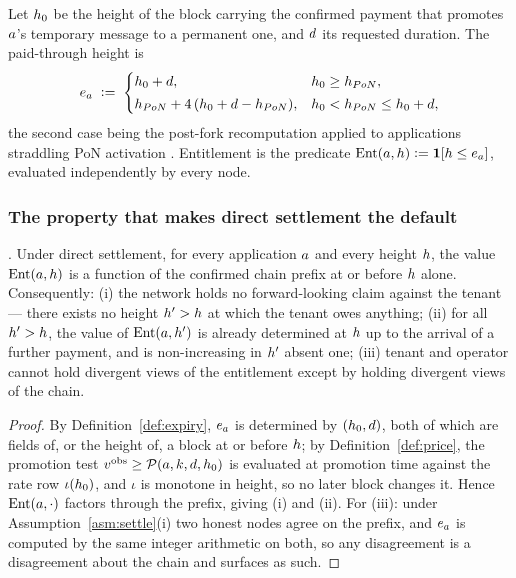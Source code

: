 \begin{definition}
\label{def:expiry}
Let $h_0$ be the height of the block carrying the confirmed payment that promotes $a$'s
temporary message to a permanent one, and $d$ its requested duration. The paid-through height is
\[
e_{a} \;\vcentcolon=\;
\begin{cases}
h_0 + d, & h_0 \ge h_{PoN},\\[2pt]
h_{PoN} + 4\,(h_0 + d - h_{PoN}), & h_0 < h_{PoN} \le h_0 + d,
\end{cases}
\]
the second case being the post-fork recomputation applied to applications straddling PoN activation
. Entitlement is the
predicate $\mathrm{Ent}(a, h) \vcentcolon= \mathbf{1}\!\left[h \le e_{a}\right]$, evaluated independently by every
node.
\end{definition}

\subsubsection{The property that makes direct settlement the default}

\begin{property}
\label{prop:nostanding}
\shipped. Under direct settlement, for every application $a$ and every height $h$, the value
$\mathrm{Ent}(a,h)$ is a function of the confirmed chain prefix at or before $h$ alone.
Consequently: (i) the network holds no forward-looking claim against the tenant --- there exists no
height $h' > h$ at which the tenant owes anything; (ii) for all $h' > h$, the value of
$\mathrm{Ent}(a,h')$ is already determined at $h$ up to the arrival of a further payment,
and is non-increasing in $h'$ absent one; (iii) tenant and operator cannot hold divergent views of
the entitlement except by holding divergent views of the chain.
\end{property}

\begin{proof}
By Definition~\ref{def:expiry}, $e_{a}$ is determined by $(h_0, d)$, both of which are fields
of, or the height of, a block at or before $h$; by Definition~\ref{def:price}, the promotion test
$v^{\mathrm{obs}} \ge \mathcal{P}(a,k,d,h_0)$ is evaluated at promotion time against the
rate row $\iota(h_0)$, and $\iota$ is monotone in height, so no later block changes it. Hence
$\mathrm{Ent}(a,\cdot)$ factors through the prefix, giving (i) and (ii). For (iii): under
Assumption~\ref{asm:settle}(i) two honest nodes agree on the prefix, and $e_{a}$ is computed by the
same integer arithmetic on both, so any disagreement is a disagreement about the chain and surfaces
as such.
\end{proof}


